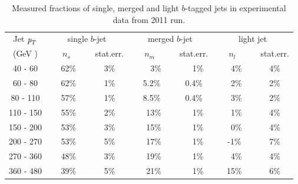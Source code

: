 \begin{table}[!hbt] %
\renewcommand{\arraystretch}{1.2}
\centering
\begin{tabular}{ | c || c | c || c | c || c | c ||}
  \hline
  Jet ${\emph{p}_{T}}$ & \multicolumn{2}{c||}{single $b$-jet} & \multicolumn{2}{c||}{merged $b$-jet} & \multicolumn{2}{c||}{~light jet~}\\ \cline{2-7}
    (GeV ) & ~~~$n_s$~~~~ & stat.err. & ~~~$n_m$~~~~ & stat.err.& ~~~$n_l$~~~~ & stat.err.\\ \hline
   40 - 60 &  62\% &  3\%  &  ~~3\%  &  ~~1\% &  ~4\%  &  4\%   \\ 
   60 - 80 &  62\% &  1\%  &  5.2\%  &  0.4\% &  ~2\%  &  2\%   \\ 
   80 - 110&  57\% &  1\%  &  8.5\%  &  0.4\% &  ~3\%  &  2\%   \\ 
  110 - 150&  55\% &  2\%  &  ~13\%  &  ~~1\% &  ~1\%  &  4\%   \\ 
  150 - 200&  53\% &  3\%  &  ~15\%  &  ~~1\% &  ~0\%  &  4\%   \\ 
  200 - 270&  53\% &  5\%  &  ~17\%  &  ~~1\% &  -1\%  &  7\%   \\ 
  270 - 360&  48\% &  3\%  &  ~19\%  &  ~~1\% &  ~4\%  &  4\%   \\ 
  360 - 480&  39\% &  5\%  &  ~21\%  &  ~~1\% &  15\%  &  6\%   \\ \hline
\end{tabular}
\caption{Measured fractions of single, merged and light $b$-tagged jets in experimental data from 2011 run.}
\label{tb:fitfractions}
\end{table}



